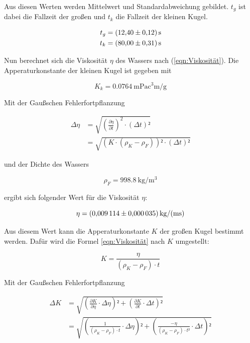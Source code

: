 Aus diesen Werten werden Mittelwert und Standardabweichung gebildet.
$t_g$ ist dabei die Fallzeit der großen und $t_k$ die Fallzeit der kleinen
Kugel.

\begin{align*}
t_g &= \SI{12.40+-0.12}{\second}\\
t_k &= \SI{80.00+-0.31}{\second}
\end{align*}

Nun berechnet sich die Viskosität $\eta$ des Wassers nach (\ref{eqn:Viskosität}).
Die Apperaturkonstante der kleinen Kugel ist gegeben mit 

\begin{equation}
K_k = \SI{0.0764}{\milli\pascal\cubic\centi\meter\per\gram}
\end{equation}

Mit der Gaußschen Fehlerfortpflanzung

\begin{align}
\Delta \eta &= \sqrt{\left(\frac{\partial\eta}{\partial t}\right)^2 \cdot \left(\Delta t\right)²}\\
&=\sqrt{\left(K\cdot(\rho_K - \rho_F)\right)²\cdot(\Delta t)²}
\label{eqn:Fehlereta}
\end{align}

und der Dichte des Wassers 

\begin{equation}
\rho _F = \SI{998.8}{\kilo\gram\per\cubic\meter}
\end{equation}

ergibt sich folgender Wert für die Viskosität $\eta$:

\begin{equation}
\eta = \SI{0.009114+-0.000035}{\kilo\gram\per(\meter\second)}
\end{equation}

Aus diesem Wert kann die Apperaturkonstante $K$ der großen Kugel
bestimmt werden. Dafür wird die Formel \ref{eqn:Viskosität} nach 
$K$ umgestellt: 

\begin{equation}
K = \frac{\eta}{(\rho_K - \rho_F) \cdot t}
\end{equation}

Mit der Gaußschen Fehlerfortpflanzung

\begin{align}
\Delta K &= \sqrt{\left(\frac{\partial K}{\partial \eta}\cdot \Delta\eta\right)² + \left(\frac{\partial K}{\partial t}\cdot \Delta t\right)²}\\
&= \sqrt{\left(\frac{1}{(\rho_K - \rho_F)\cdot t}\cdot \Delta\eta\right)² + \left(\frac{-\eta}{(\rho_K - \rho_F)\cdot t²}\cdot \Delta t\right)²}
\end{align}

